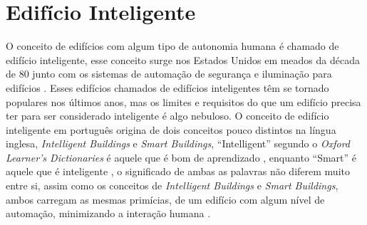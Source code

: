\chapter{Edifício Inteligente}

O conceito de edifícios com algum tipo de autonomia humana é chamado de edifício inteligente, esse conceito surge nos Estados Unidos em meados da década de 80 junto com os sistemas de automação de segurança e iluminação para edifícios \cite{raissa2002}. Esses edifícios chamados de edifícios inteligentes têm se tornado populares nos últimos anos, mas os limites e requisitos do que um edifício precisa ter para ser considerado inteligente é algo nebuloso. O conceito de edifício inteligente em português origina de dois conceitos pouco distintos na língua inglesa, \emph{Intelligent Buildings} e \emph{Smart Buildings},
``Intelligent'' segundo o \emph{Oxford Learner's Dictionaries} é aquele que é bom de aprendizado \cite{intelligence-oxford}, enquanto ``Smart'' é aquele que é inteligente \cite{smart-oxford}, o significado de ambas as palavras não diferem muito entre si, assim como os conceitos de \emph{Intelligent Buildings} e \emph{Smart Buildings}, ambos carregam as mesmas primícias, de um edifício com algum nível de automação, minimizando a interação humana \cite{Wong2005}.

